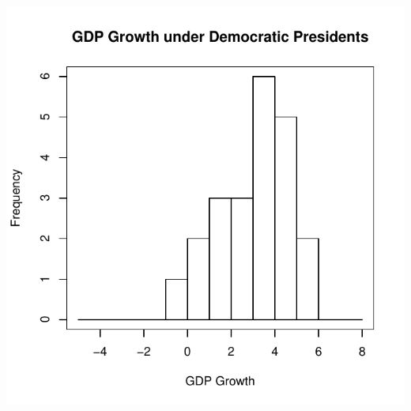 \documentclass[pdflatex,landscape,titlepage]{foils}
\begin{document}
\begin{center}

\includegraphics[width=7.5 in]{gdphist_dem}

\end{center}
\end{document}
